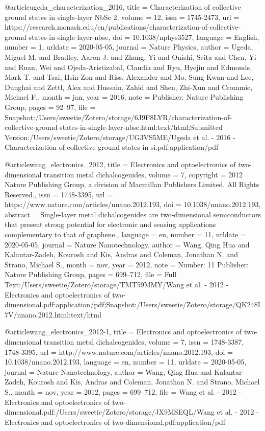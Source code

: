 {@article{ugeda_characterization_2016,
	title = {Characterization of collective ground states in single-layer {NbSe} 2},
	volume = {12},
	issn = {1745-2473},
	url = {https://research.monash.edu/en/publications/characterization-of-collective-ground-states-in-single-layer-nbse},
	doi = {10.1038/nphys3527},
	language = {English},
	number = {1},
	urldate = {2020-05-05},
	journal = {Nature Physics},
	author = {Ugeda, Miguel M. and Bradley, Aaron J. and Zhang, Yi and Onishi, Seita and Chen, Yi and Ruan, Wei and Ojeda-Aristizabal, Claudia and Ryu, Hyejin and Edmonds, Mark T. and Tsai, Hsin-Zon and Riss, Alexander and Mo, Sung Kwan and Lee, Dunghai and Zettl, Alex and Hussain, Zahid and Shen, Zhi-Xun and Crommie, Michael F.},
	month = jan,
	year = {2016},
	note = {Publisher: Nature Publishing Group},
	pages = {92--97},
	file = {Snapshot:/Users/sweetie/Zotero/storage/6J9F8LYR/characterization-of-collective-ground-states-in-single-layer-nbse.html:text/html;Submitted Version:/Users/sweetie/Zotero/storage/UG3VS5ME/Ugeda et al. - 2016 - Characterization of collective ground states in si.pdf:application/pdf}
}

@article{wang_electronics_2012,
	title = {Electronics and optoelectronics of two-dimensional transition metal dichalcogenides},
	volume = {7},
	copyright = {2012 Nature Publishing Group, a division of Macmillan Publishers Limited. All Rights Reserved.},
	issn = {1748-3395},
	url = {https://www.nature.com/articles/nnano.2012.193},
	doi = {10.1038/nnano.2012.193},
	abstract = {Single-layer metal dichalcogenides are two-dimensional semiconductors that present strong potential for electronic and sensing applications complementary to that of graphene.},
	language = {en},
	number = {11},
	urldate = {2020-05-05},
	journal = {Nature Nanotechnology},
	author = {Wang, Qing Hua and Kalantar-Zadeh, Kourosh and Kis, Andras and Coleman, Jonathan N. and Strano, Michael S.},
	month = nov,
	year = {2012},
	note = {Number: 11
Publisher: Nature Publishing Group},
	pages = {699--712},
	file = {Full Text:/Users/sweetie/Zotero/storage/TMT59MMY/Wang et al. - 2012 - Electronics and optoelectronics of two-dimensional.pdf:application/pdf;Snapshot:/Users/sweetie/Zotero/storage/QK248I7V/nnano.2012.html:text/html}
}

@article{wang_electronics_2012-1,
	title = {Electronics and optoelectronics of two-dimensional transition metal dichalcogenides},
	volume = {7},
	issn = {1748-3387, 1748-3395},
	url = {http://www.nature.com/articles/nnano.2012.193},
	doi = {10.1038/nnano.2012.193},
	language = {en},
	number = {11},
	urldate = {2020-05-05},
	journal = {Nature Nanotechnology},
	author = {Wang, Qing Hua and Kalantar-Zadeh, Kourosh and Kis, Andras and Coleman, Jonathan N. and Strano, Michael S.},
	month = nov,
	year = {2012},
	pages = {699--712},
	file = {Wang et al. - 2012 - Electronics and optoelectronics of two-dimensional.pdf:/Users/sweetie/Zotero/storage/JX9MSEQL/Wang et al. - 2012 - Electronics and optoelectronics of two-dimensional.pdf:application/pdf}
}

}
